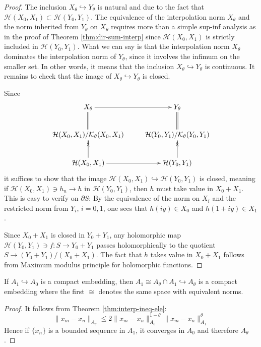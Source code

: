 \begin{proof}
The inclusion \(X_\theta \hookrightarrow Y_\theta\) is natural and due to the fact that
\(\mathcal{H}(X_0, X_1) \subset \mathcal{H}(Y_0, Y_1)\). The equivalence of the
interpolation norm \(X_\theta\) and the norm inherited from \(Y_\theta\) on \(X_\theta\) requires more than a simple sup-inf analysis as in the proof
of Theorem \ref{thm:dir-sum-interp} since \(\mathcal{H}(X_0, X_1)\) is strictly included
in \(\mathcal{H}(Y_0, Y_1)\). What we can say is that the interpolation norm \(X_\theta\) dominates the interpolation norm of \(Y_\theta\), since it involves the infimum on
the smaller set. In other words, it means that the inclusion \(X_\theta \hookrightarrow
Y_\theta\) is continuous. It remains to check that the image of \(X_\theta \hookrightarrow Y_\theta\) is closed.

Since
\[
 \xymatrix{
X_\theta \ar@{->}[r] & Y_\theta \\
\mathcal{H}(X_0, X_1)/\mathcal{K}_\theta(X_0, X_1) \ar@{=}[u] & \mathcal{H}(Y_0,Y_1)/\mathcal{K}_\theta(Y_0, Y_1) \ar@{=}[u] \\
\mathcal{H}(X_0, X_1) \ar@{->}[r] \ar@{->>}[u] & \mathcal{H}(Y_0, Y_1) \ar@{->>}[u]
}
\]
it suffices to show that the image \(\mathcal{H}(X_0,X_1) \hookrightarrow
\mathcal{H}(Y_0,Y_1)\) is closed, meaning if \(\mathcal{H}(X_0,X_1)\ni h_n \to h\) in \(\mathcal{H}(Y_0,Y_1)\), then \(h\) must take value in \(X_0 + X_1\). This is easy to
verify on \(\partial S\): By the
equivalence of the norm on \(X_i\) and the restricted norm from \(Y_i\), \(i=0,1\),
one sees that \(h(iy)\in X_0\) and \(h(1+iy)\in X_1\).

Since \(X_0+X_1\) is
closed in \(Y_0+Y_1\), any holomorphic map \(\mathcal{H}(Y_0,Y_1)\ni f: S
\longrightarrow Y_0+Y_1\) passes holomorphically to the quotient \(S \longrightarrow (Y_0
+Y_1) /(X_0+X_1)\). The fact that \(h\) takes value in \(X_0 + X_1\) follows from
Maximum modulus principle for holomorphic functions.
\end{proof}


\begin{theorem}
\label{thm:compact-interp}
If \(A_1 \hookrightarrow A_0\) is a compact embedding, then \(A_1 \cong A_\theta\cap A_1
\hookrightarrow A_\theta\) is a compact embedding where the first \(\cong\) denotes the
same space with equivalent norms.
\end{theorem}
\begin{proof}
It follows from Theorem \ref{thm:interp-ineq-ele}:
\[
 \|x_m - x_n\|_{A_\theta}\leq 2 \|x_m-x_n\|^{1-\theta}_{A_0} \|x_m-x_n\|_{A_1}^\theta
\]
Hence if \(\{x_n\}\) is a bounded sequence in \(A_1\), it converges in \(A_0\) and
therefore \(A_\theta\).
\end{proof}

